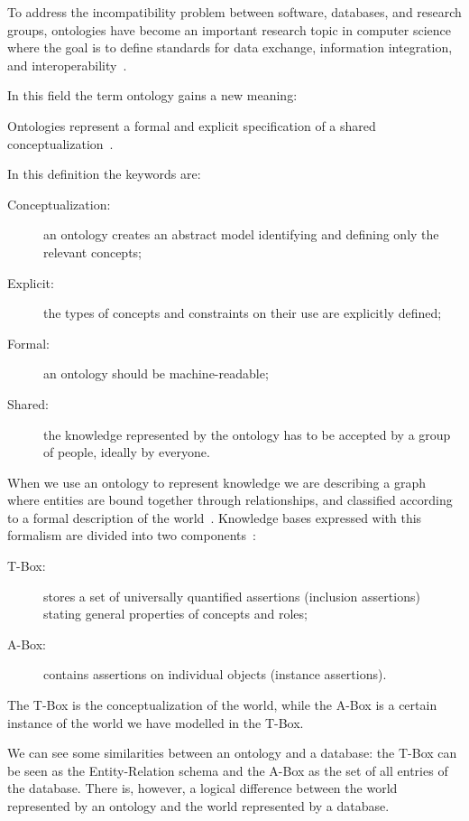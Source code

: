 To address the incompatibility problem between software, databases, and research groups, ontologies have become an important research topic in computer science where the goal is to define standards for data exchange, information integration, and interoperability~\cite{zarri2005ontologies}.

In this field the term ontology gains a new meaning:
\begin{definition}
	Ontologies represent a formal and explicit specification of a shared conceptualization~\cite{gruber1993translation}.
\end{definition}
In this definition the keywords are:
\begin{description}
	\item[Conceptualization:] an ontology creates an abstract model identifying and defining only the relevant concepts;
	\item[Explicit:] the types of concepts and constraints on their use are explicitly defined;
	\item[Formal:] an ontology should be machine-readable;
	\item[Shared:] the knowledge represented by the ontology has to be accepted by a group of people, ideally by everyone.
\end{description}

When we use an ontology to represent knowledge we are describing a graph where entities are bound together through relationships, and classified according to a formal description of the world~\cite{fossati2018n}. Knowledge bases expressed with this formalism are divided into two components~\cite{de1996tbox}: 
\begin{description}
	\item[T-Box:] stores a set of universally quantified assertions (inclusion assertions) stating general properties of concepts and roles;
	\item[A-Box:] contains assertions on individual objects (instance assertions).
\end{description}
The T-Box is the conceptualization of the world, while the A-Box is a certain instance of the world we have modelled in the T-Box.

We can see some similarities between an ontology and a database: the T-Box can be seen as the Entity-Relation schema and the A-Box as the set of all entries of the database. There is, however, a logical difference between the world represented by an ontology and the world represented by a database.

